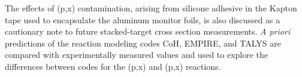 The effects of  (p,x) contamination, arising from  silicone adhesive in the Kapton tape used to encapsulate the aluminum monitor foils, is also discussed as a cautionary note to future stacked-target cross section measurements.
\emph{A priori} predictions of the reaction modeling codes  CoH, EMPIRE, and TALYS are compared with experimentally measured values and used to explore the differences between codes for the
(p,x) and  (p,x) reactions.






